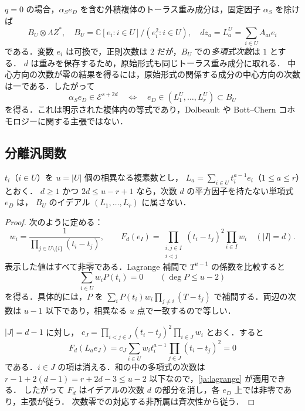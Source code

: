 \documentclass[12pt]{amsart}
\theoremstyle{definition}
\theoremstyle{remark}
\numberwithin{equation}{section}
\newcommand{\C}{\mathbb{C}}
\newcommand{\Eex}{\mathcal E}
\begin{document}
$q=0$ の場合，$\alpha_S e_D$ を含む外積複体のトーラス重み成分は，固定因子 $\alpha_S$ を除けば
\begin{equation}\label{ja:boolean}
 B_U\otimes\Lambda Z^*,\quad
 B_U=\C[e_i:i\in U]/(e_i^2:i\in U),\quad
 d z_a=L_a^U=\sum_{i\in U}A_{ai}e_i
\end{equation}
である．変数 $e_i$ は可換で，正則次数は $2$ だが，$B_U$ での\emph{多項式次数}は $1$ とする．
$d$ は重みを保存するため，原始形式も同じトーラス重み成分に取れる．
中心方向の次数が零の結果を得るには，原始形式の関係する成分の中心方向の次数は一である．したがって
\begin{equation}\label{ja:ideal}
 \alpha_S e_D\in\Eex^{s+2d}
 \quad\Longleftrightarrow\quad
 e_D\in(L_1^U,\ldots,L_r^U)\subset B_U
\end{equation}
を得る．これは明示された複体内の等式であり，Dolbeault や Bott--Chern コホモロジーに関する主張ではない．

\subsection{分離汎関数}
\begin{jlem}\label{ja:interpolation}
$t_i$（$i\in U$）を $u=|U|$ 個の相異なる複素数とし，
$L_a=\sum_{i\in U}t_i^{a-1}e_i$（$1\leq a\leq r$）とおく．
$d\geq1$ かつ $2d\leq u-r+1$ なら，次数 $d$ の平方因子を持たない単項式 $e_D$ は，
$B_U$ のイデアル $(L_1,\ldots,L_r)$ に属さない．
\end{jlem}
\begin{proof}
次のように定める：
\begin{equation}\label{ja:functional}
 w_i=\frac1{\prod_{j\in U\setminus\{i\}}(t_i-t_j)},\qquad
 F_d(e_I)=
 \prod_{\substack{i,j\in I\\i<j}}(t_i-t_j)^2\prod_{i\in I}w_i
 \quad(|I|=d).
\end{equation}
表示した値はすべて非零である．Lagrange 補間で $T^{u-1}$ の係数を比較すると
\begin{equation}\label{ja:lagrange}
 \sum_{i\in U}w_i P(t_i)=0\qquad(\deg P\leq u-2)
\end{equation}
を得る．具体的には，$P$ を
$\sum_i P(t_i)w_i\prod_{j\ne i}(T-t_j)$ で補間する．両辺の次数は $u-1$ 以下であり，相異なる $u$ 点で一致するので等しい．

$|J|=d-1$ に対し，
$c_J=\prod_{i<j\in J}(t_i-t_j)^2\prod_{i\in J}w_i$ とおく．すると
\begin{equation}\label{ja:annihilation}
 F_d(L_a e_J)=c_J\sum_{i\in U}w_i t_i^{a-1}
                         \prod_{j\in J}(t_i-t_j)^2=0
\end{equation}
である．$i\in J$ の項は消える．和の中の多項式の次数は
$r-1+2(d-1)=r+2d-3\leq u-2$ 以下なので，\eqref{ja:lagrange} が適用できる．
したがって $F_d$ はイデアルの次数 $d$ の部分を消し，各 $e_D$ 上では非零であり，主張が従う．
次数零での対応する非所属は斉次性から従う．
\end{proof}
\end{document}
